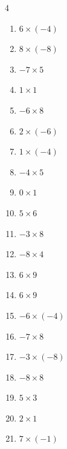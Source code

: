 \begin{multicols}{4}
\begin{enumerate}
\columnbreak %

  \item $6\times (-4)$
        \phantom{$=-24$}

  \item $8\times (-8)$
        \phantom{$=-64$}

  \item $-7\times 5$
        \phantom{$=-35$}

  \item $1\times 1$
        \phantom{$=1$}

  \item $-6\times 8$
        \phantom{$=-48$}

  \item $2\times (-6)$
        \phantom{$=-12$}

  \item $1\times (-4)$
        \phantom{$=-4$}

  \item $-4\times 5$
        \phantom{$=-20$}

  \item $0\times 1$
        \phantom{$=0$}

  \item $5\times 6$
        \phantom{$=30$}

  \item $-3\times 8$
        \phantom{$=-24$}

  \item $-8\times 4$
        \phantom{$=-32$}

  \item $6\times 9$
        \phantom{$=54$}

  \item $6\times 9$
        \phantom{$=54$}

  \item $-6\times (-4)$
        \phantom{$=24$}

  \item $-7\times 8$
        \phantom{$=-56$}

  \item $-3\times (-8)$
        \phantom{$=24$}

  \item $-8\times 8$
        \phantom{$=-64$}

  \item $5\times 3$
        \phantom{$=15$}

  \item $2\times 1$
        \phantom{$=2$}

  \item $7\times (-1)$
        \phantom{$=-7$}


\end{enumerate}
\end{multicols}
